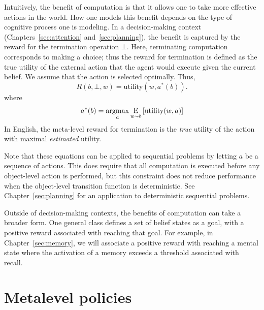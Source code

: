Intuitively, the benefit of computation is that it allows one to take more effective actions in the world. How one models this benefit depends on the type of cognitive process one is modeling. In a decision-making context (Chapters~\ref{sec:attention} and~\ref{sec:planning}), the benefit is captured by the reward for the termination operation $\bot$. Here, terminating computation corresponds to making a choice; thus the reward for termination is defined as the true utility of the external action\footnotemark{} that the agent would execute given the current belief. We assume that the action is selected optimally. Thus,
%
\begin{equation}\label{eq:term-reward}
R(b, \bot, w) = \text{utility}(w, a^*(b)).
\end{equation}
%
where
%
\begin{equation}\label{eq:object-action}
a^*(b) = \argmax_a \expectunder{\text{utility}(w, a)}{w \sim b}
\end{equation}
%
In English, the meta-level reward for termination is the \emph{true} utility of the action\footnotemark{} with maximal \emph{estimated} utility.


Note that these equations can be applied to sequential problems by letting $a$ be a sequence of actions. This does require that all computation is executed before any object-level action is performed, but this constraint does not reduce performance when the object-level transition function is deterministic. See Chapter~\ref{sec:planning} for an application to deterministic sequential problems.

Outside of decision-making contexts, the benefits of computation can take a broader form. One general class defines a set of belief states as a goal, with a positive reward associated with reaching that goal. For example, in Chapter~\ref{sec:memory}, we will associate a positive reward with reaching a mental state where the activation of a memory exceeds a threshold associated with recall.


\section{Metalevel policies}\label{sec:metamdp-policy}

